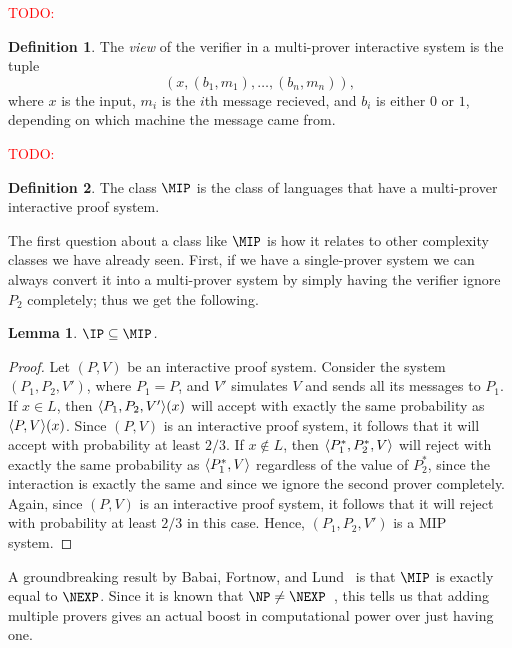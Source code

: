 \documentclass[english,12pt]{reedthesis}
\theoremstyle{plain}
\newtheorem{lemma}[lemma]{Lemma}
\theoremstyle{definition}
\newtheorem{defn}[defn]{Definition}
\theoremstyle{remark}
\DeclarePairedDelimiter{\ang}{\langle}{\rangle}
\newcommand{\TODO}[1]{\textcolor{red}{TODO: #1}}
\begin{document}
\TODO{}

\begin{defn}\label{def:view-mip}
  The \emph{view} of the verifier in a multi-prover interactive system is the
  tuple
  \[
    (x, (b_{1}, m_{1}), \ldots, (b_{n}, m_{n})),
  \]
  where $x$ is the input, $m_{i}$ is the $i$th message recieved, and $b_{i}$ is
  either $0$ or $1$, depending on which machine the message came from.
\end{defn}

\TODO{}

\begin{defn}\label{def:mip}
  The class $\MIP$ is the class of languages that have a multi-prover
  interactive proof system.
\end{defn}

The first question about a class like $\MIP$ is how it relates to other
complexity classes we have already seen. First, if we have a single-prover
system we can always convert it into a multi-prover system by simply having the
verifier ignore $P_{2}$ completely; thus we get the following.

\begin{lemma}\label{lem:ip-in-mip}
  $\IP \subseteq \MIP$.
\end{lemma}

\begin{proof}
  Let $(P, V)$ be an interactive proof system. Consider the system
  $(P_{1}, P_{2}, V')$, where $P_{1} = P$, and $V'$ simulates $V$ and sends all
  its messages to $P_{1}$. If $x \in L$, then $\ang{P_{1}, P_{2}, V'}(x)$ will
  accept with exactly the same probability as $\ang{P, V}(x)$. Since $(P, V)$ is
  an interactive proof system, it follows that it will accept with probability
  at least $2/3$. If $x \notin L$, then $\ang{P_{1}^{*}, P_{2}^{*}, V}$ will reject
  with exactly the same probability as $\ang{P_{1}^{*}, V}$ regardless of the
  value of $P_{2}^{*}$, since the interaction is exactly the same and since we
  ignore the second prover completely. Again, since $(P, V)$ is an interactive
  proof system, it follows that it will reject with probability at least $2/3$
  in this case. Hence, $(P_{1}, P_{2}, V')$ is a MIP system.
\end{proof}

A groundbreaking result by Babai, Fortnow, and Lund~\cite{BFL90} is that $\MIP$
is exactly equal to $\NEXP$. Since it is known that $\NP \ne \NEXP$~\cite{Cook73},
this tells us that adding multiple provers gives an actual boost in
computational power over just having one.
\end{document}
